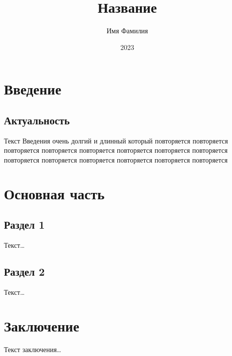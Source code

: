 \documentclass[a4paper,12pt]{article}
\begin{document}
\title{Название}
\author{Имя Фамилия}
\date{2023}

\maketitle

\tableofcontents
\newpage

\section{Введение}
\subsection{Актуальность}
Текст Введения очень долгий и длинный который повторяется повторяется повторяется повторяется повторяется повторяется повторяется повторяется повторяется повторяется повторяется повторяется повторяется повторяется 

\section{Основная часть}
\subsection{Раздел 1}
Текст\dots

\subsection{Раздел 2}
Текст\dots

\section{Заключение}
Текст заключения\dots

\printbibliography{}
\end{document}
